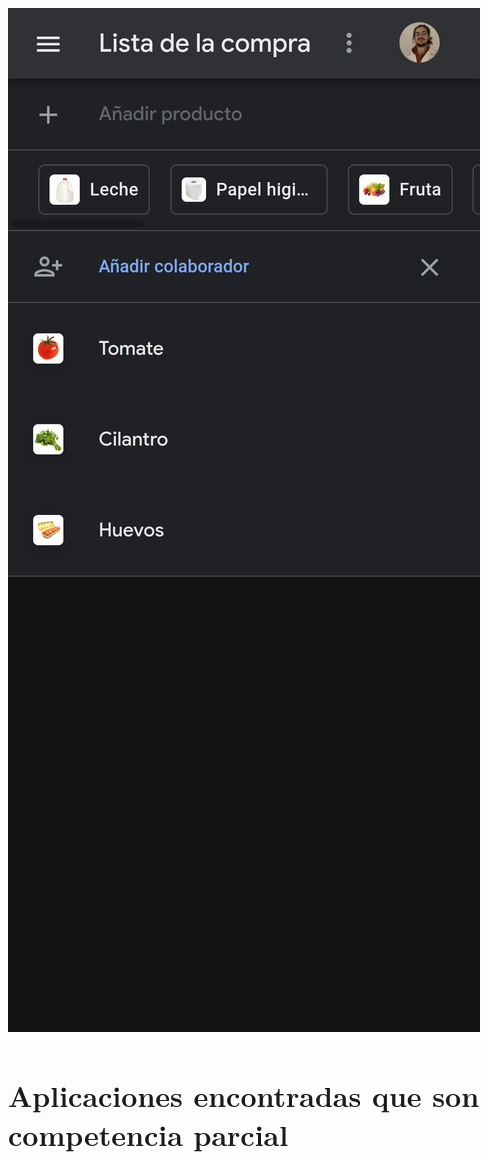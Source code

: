 \begin{minipage}[t]{0.5\textwidth}
    \centering\vspace{0pt}
    \includegraphics[trim=0 800 0 0, clip, width=.8\textwidth]{images/Screenshot_2020-11-09 Google Shopping List.png}
\end{minipage}
\section{Aplicaciones encontradas que son competencia parcial}
